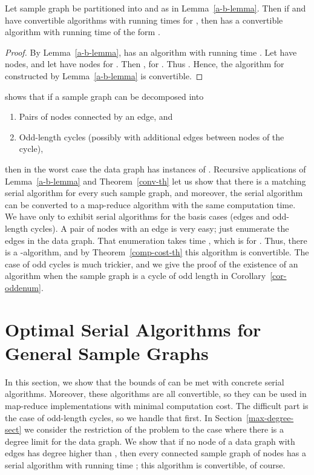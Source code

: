 \begin{theorem}
\label{conv-th}
Let sample graph  be partitioned into  and  as in Lemma~\ref{a-b-lemma}.
Then if  and  have convertible algorithms with running times  for , then  has a convertible algorithm with running time of the form .
\end{theorem}

\begin{proof}
By Lemma~\ref{a-b-lemma},  has an algorithm with running time .
Let  have  nodes, and let  have  nodes for .
Then , for .
Thus .
Hence, the algorithm for  constructed by Lemma~\ref{a-b-lemma} is convertible.
\end{proof}

\begin{example}
\label{decomp-ex}
\cite{Alon81} shows that if a sample graph  can be decomposed into

\begin{enumerate}

\item
Pairs of nodes connected by an edge, and

\item
Odd-length cycles (possibly with additional edges between nodes of the cycle),

\end{enumerate}
then in the worst case the data graph has  instances of .
Recursive applications of Lemma~\ref{a-b-lemma} and Theorem~\ref{conv-th} let us show that there is a matching serial algorithm for every such sample graph, and moreover, the serial algorithm can be converted to a map-reduce algorithm with the same computation time.
We have only to exhibit serial algorithms for the basis cases (edges and odd-length cycles).
A pair of nodes with an edge is very easy; just enumerate the edges in the data graph.
That enumeration takes time , which is  for .
Thus, there is a -algorithm, and by Theorem~\ref{comp-cost-th} this algorithm is convertible.  The case of odd cycles is much trickier, and we give the proof of the existence of an  algorithm when the sample graph is a cycle of odd length  in Corollary~\ref{cor-oddenum}.
\end{example}

\section{Optimal Serial Algorithms for General Sample Graphs}
\label{serial-alg-sect}

In this section, we show that the bounds of \cite{Alon81} can be met with concrete serial algorithms.  Moreover, these algorithms are all convertible, so they can be used in map-reduce implementations with minimal computation cost.  The difficult part is the case of odd-length cycles, so we handle that first.
In Section~\ref{max-degree-sect}  we consider the restriction of the problem to the case where there is a degree limit for the data graph.  We show that if no node of a data graph with  edges has degree higher than , then every connected sample graph of  nodes has a serial algorithm with running time ; this algorithm is convertible, of course.

